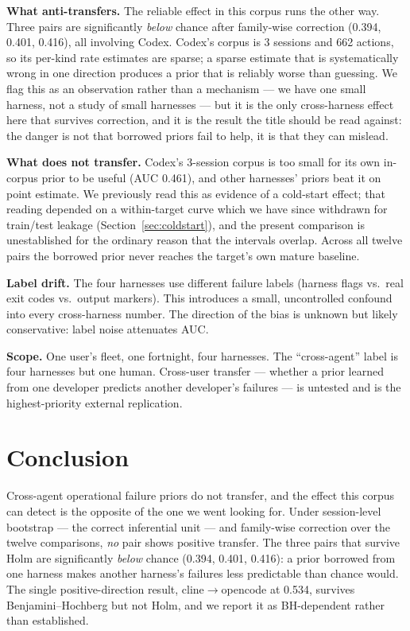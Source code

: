 \documentclass[11pt]{article}
\begin{document}
\textbf{What anti-transfers.} The reliable effect in this corpus runs the
other way. Three pairs are significantly \emph{below} chance after
family-wise correction (0.394, 0.401, 0.416), all involving Codex. Codex's
corpus is 3 sessions and 662 actions, so its per-kind rate estimates are
sparse; a sparse estimate that is systematically wrong in one direction
produces a prior that is reliably worse than guessing. We flag this as an
observation rather than a mechanism --- we have one small harness, not a
study of small harnesses --- but it is the only cross-harness effect here
that survives correction, and it is the result the title should be read
against: the danger is not that borrowed priors fail to help, it is that
they can mislead.

\textbf{What does not transfer.} Codex's 3-session corpus is too small for
its own in-corpus prior to be useful (AUC 0.461), and other harnesses'
priors beat it on point estimate. We previously read this as evidence of a
cold-start effect; that reading depended on a within-target curve which we
have since withdrawn for train/test leakage
(Section~\ref{sec:coldstart}), and the present comparison is unestablished
for the ordinary reason that the intervals overlap. Across all twelve
pairs the borrowed prior never reaches the target's own mature baseline.

\textbf{Label drift.} The four harnesses use different failure labels
(harness flags vs.\ real exit codes vs.\ output markers). This introduces
a small, uncontrolled confound into every cross-harness number. The
direction of the bias is unknown but likely conservative: label noise
attenuates AUC.

\textbf{Scope.} One user's fleet, one fortnight, four harnesses. The
``cross-agent'' label is four harnesses but one human. Cross-user
transfer --- whether a prior learned from one developer predicts another
developer's failures --- is untested and is the highest-priority external
replication.

\section{Conclusion}

Cross-agent operational failure priors do not transfer, and the effect this
corpus can detect is the opposite of the one we went looking for. Under
session-level bootstrap --- the correct inferential unit --- and family-wise
correction over the twelve comparisons, \emph{no} pair shows positive
transfer. The three pairs that survive Holm are significantly \emph{below}
chance (0.394, 0.401, 0.416): a prior borrowed from one harness makes
another harness's failures less predictable than chance would. The single
positive-direction result, cline$\to$opencode at 0.534, survives
Benjamini--Hochberg but not Holm, and we report it as BH-dependent rather
than established.
\end{document}
